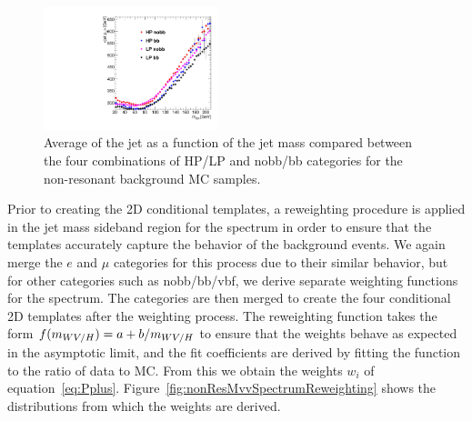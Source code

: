 \begin{figure}[htbp]
  \centering
  \includegraphics[width=0.45\textwidth]{fig/2Dfit/nonRes_corr.pdf}
  \caption{
    Average \pt of the jet as a function of the jet mass \MJ compared between the four combinations of HP/LP and nobb/bb categories for the non-resonant background MC samples.
  }
  \label{fig:nonRes2DCorr}
\end{figure}

Prior to creating the 2D conditional templates, a reweighting procedure is applied in the jet mass sideband region for the \MVV spectrum in order to ensure that the templates accurately capture the behavior of the background events.
We again merge the $e$ and $\mu$ categories for this process due to their similar behavior, but for other categories such as nobb/bb/vbf, we derive separate weighting functions for the \MVV spectrum.
The categories are then merged to create the four conditional 2D templates after the weighting process.
The reweighting function takes the form $f(m_{WV/H})=a+b/m_{WV/H}$ to ensure that the weights behave as expected in the asymptotic limit, and the fit coefficients are derived by fitting the function to the ratio of data to MC.
From this we obtain the weights $w_i$ of equation~\ref{eq:Pplus}.
Figure~\ref{fig:nonResMvvSpectrumReweighting} shows the \MVV distributions from which the weights are derived.

